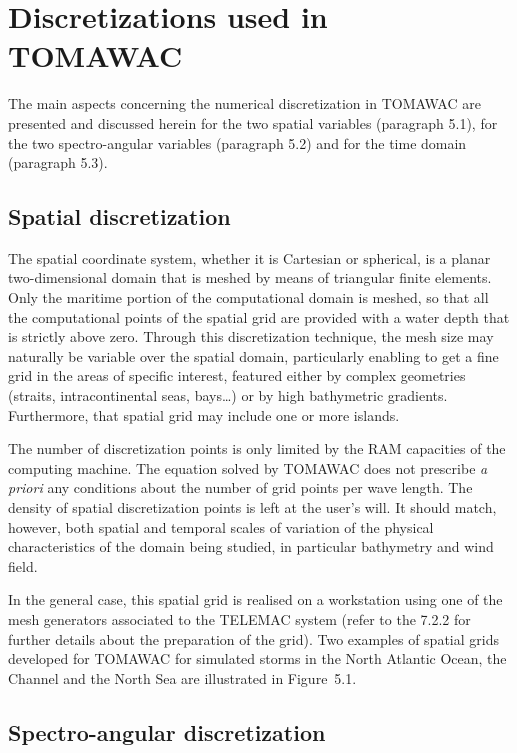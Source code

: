 

\chapter{ Discretizations used in TOMAWAC}

 The main aspects concerning the numerical discretization in TOMAWAC are presented and discussed herein for the two spatial variables (paragraph 5.1), for the two spectro-angular variables (paragraph 5.2) and for the time domain (paragraph 5.3).


\section{ Spatial discretization}

 The spatial coordinate system, whether it is Cartesian or spherical, is a planar two-dimensional domain that is meshed by means of triangular finite elements. Only the maritime portion of the computational domain is meshed, so that all the computational points of the spatial grid are provided with a water depth that is strictly above zero. Through this discretization technique, the mesh size may naturally be variable over the spatial domain, particularly enabling to get a fine grid in the areas of specific interest, featured either by complex geometries (straits, intracontinental seas, bays\dots ) or by high bathymetric gradients. Furthermore, that spatial grid may include one or more islands.

 The number of discretization points is only limited by the RAM capacities of the computing machine. The equation solved by TOMAWAC does not prescribe \textit{a priori }any conditions about the number of grid points per wave length. The density of spatial discretization points is left at the user's will. It should match, however, both spatial and temporal scales of variation of the physical characteristics of the domain being studied, in particular bathymetry and wind field.

 In the general case, this spatial grid is realised on a workstation using one of the mesh generators associated to the TELEMAC system (refer to the 7.2.2 for further details about the preparation of the grid). Two examples of spatial grids developed for TOMAWAC for simulated storms in the North Atlantic Ocean, the Channel and the North Sea are illustrated in Figure~5.1.


\section{ Spectro-angular discretization}


